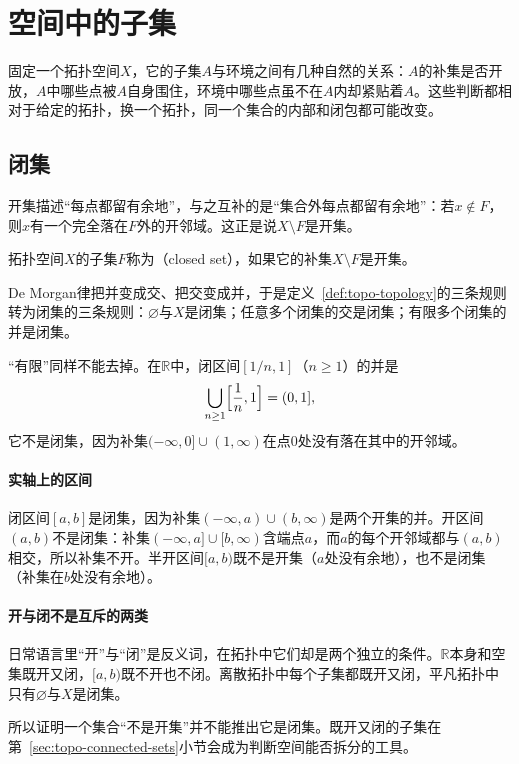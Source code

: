 \section{空间中的子集}
\label{sec:topo-subsets}

固定一个拓扑空间$X$，它的子集$A$与环境之间有几种自然的关系：$A$的补集是否开放，$A$中哪些点被$A$自身围住，环境中哪些点虽不在$A$内却紧贴着$A$。这些判断都相对于给定的拓扑，换一个拓扑，同一个集合的内部和闭包都可能改变。

\subsection{闭集}
\label{sec:topo-closed-sets}

开集描述“每点都留有余地”，与之互补的是“集合外每点都留有余地”：若$x\notin F$，则$x$有一个完全落在$F$外的开邻域。这正是说$X\setminus F$是开集。

\begin{definition}[闭集]
\label{def:topo-closed-set}
拓扑空间$X$的子集$F$称为（closed set），如果它的补集$X\setminus F$是开集。
\end{definition}

De Morgan律把并变成交、把交变成并，于是定义~\ref{def:topo-topology}的三条规则转为闭集的三条规则：$\varnothing$与$X$是闭集；任意多个闭集的交是闭集；有限多个闭集的并是闭集。

“有限”同样不能去掉。在$\mathbb R$中，闭区间$[1/n,1]$（$n\geq1$）的并是
\[
 \bigcup_{n\geq1}\Bigl[\frac1n,1\Bigr]=(0,1],
\]
它不是闭集，因为补集$(-\infty,0]\cup(1,\infty)$在点$0$处没有落在其中的开邻域。

\paragraph{实轴上的区间}
闭区间$[a,b]$是闭集，因为补集$(-\infty,a)\cup(b,\infty)$是两个开集的并。开区间$(a,b)$不是闭集：补集$(-\infty,a]\cup[b,\infty)$含端点$a$，而$a$的每个开邻域都与$(a,b)$相交，所以补集不开。半开区间$[a,b)$既不是开集（$a$处没有余地），也不是闭集（补集在$b$处没有余地）。

\paragraph{开与闭不是互斥的两类}
日常语言里“开”与“闭”是反义词，在拓扑中它们却是两个独立的条件。$\mathbb R$本身和空集既开又闭，$[a,b)$既不开也不闭。离散拓扑中每个子集都既开又闭，平凡拓扑中只有$\varnothing$与$X$是闭集。

所以证明一个集合“不是开集”并不能推出它是闭集。既开又闭的子集在第~\ref{sec:topo-connected-sets}小节会成为判断空间能否拆分的工具。

